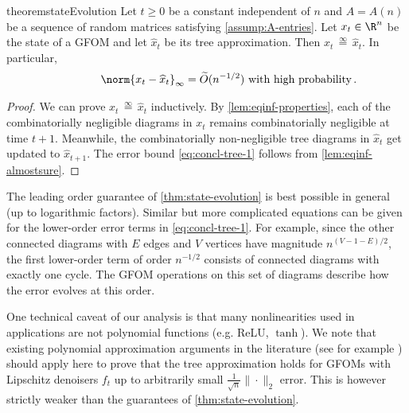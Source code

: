 \documentclass[12pt]{article}
\newcommand{\eqinf}{\,\overset{\infty}{=}\,}
\begin{document}
\begin{restatable}{theorem}{stateEvolution}
\label{thm:state-evolution}
    Let $t\ge 0$ be a constant independent of $n$ and $A=A(n)$ be a sequence of random matrices satisfying \cref{assump:A-entries}. 
    Let $x_t\in \R^n$ be the state of a GFOM and let $\widehat{x}_t$ be its tree approximation.
    Then $x_t \eqinf \widehat{x}_t$. In particular,
    \begin{align}
         \label{eq:concl-tree-1} \qquad \qquad \norm{x_t - \widehat{x}_t}_\infty = \widetilde{O}(n^{-1/2})\text{ with high probability}\,.
    \end{align}
\end{restatable}



\begin{proof}
    We can prove $x_t \eqinf \widehat{x}_t$ inductively.
    By \cref{lem:eqinf-properties}, each of the combinatorially negligible diagrams
    in $x_t$ remains combinatorially negligible at time $t+1$.
    Meanwhile, the combinatorially non-negligible tree diagrams in $\widehat{x}_t$ get updated to $\widehat{x}_{t+1}$.
    The error bound \cref{eq:concl-tree-1} follows from \cref{lem:eqinf-almostsure}.
\end{proof}



\begin{remark}\label{rem:lower-order}
    The leading order guarantee of \cref{thm:state-evolution} 
    is best possible in general
    (up to logarithmic factors). Similar but more complicated equations can be given
    for the lower-order error terms in \cref{eq:concl-tree-1}. For example, since the other connected diagrams with $E$ edges and $V$ vertices
    have magnitude $n^{(V - 1 - E)/2}$, the first lower-order term of order $n^{-1/2}$ consists
    of connected diagrams with exactly one cycle.
    The GFOM operations on this set of diagrams describe how the error evolves at this order.
\end{remark}

\begin{remark}
    One technical caveat of our analysis is that many nonlinearities used in applications are not polynomial functions (e.g. \textnormal{ReLU}, $\tanh$). We note that existing polynomial approximation arguments in the literature (see for example \cite{montanari2022equivalence, ivkov2023semidefinite}) should apply here to prove that the tree approximation holds for GFOMs with Lipschitz denoisers $f_t$ up to arbitrarily small $\frac 1 {\sqrt n}\|\cdot\|_2$ error. This is however strictly weaker than the guarantees of \cref{thm:state-evolution}.
\end{remark}
\end{document}
